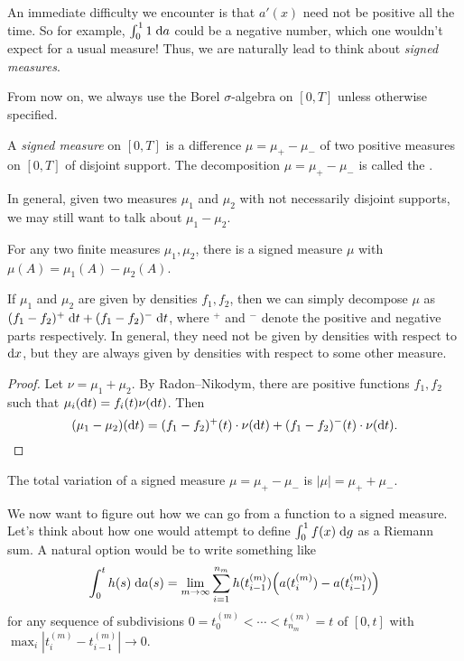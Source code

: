\documentclass[a4paper]{article}
\begin{document}
An immediate difficulty we encounter is that $a'(x)$ need not be positive all the time. So for example, $\int_0^1 1 \;\mathrm{d} a$ could be a negative number, which one wouldn't expect for a usual measure! Thus, we are naturally lead to think about \emph{signed measures}.

From now on, we always use the Borel $\sigma$-algebra on $[0, T]$ unless otherwise specified.
\begin{defi}
  A \emph{signed measure} on $[0, T]$ is a difference $\mu = \mu_+ - \mu_-$ of two positive measures on $[0, T]$ of disjoint support. The decomposition $\mu = \mu_+ - \mu_-$ is called the .
\end{defi}

In general, given two measures $\mu_1$ and $\mu_2$ with not necessarily disjoint supports, we may still want to talk about $\mu_1 - \mu_2$.
\begin{thm}
  For any two finite measures $\mu_1, \mu_2$, there is a signed measure $\mu$ with $\mu(A) = \mu_1(A) - \mu_2(A)$.
\end{thm}

If $\mu_1$ and $\mu_2$ are given by densities $f_1, f_2$, then we can simply decompose $\mu$ as $(f_1 - f_2)^+\;\mathrm{d} t + (f_1 - f_2)^- \;\mathrm{d} t$, where $^+$ and $^-$ denote the positive and negative parts respectively. In general, they need not be given by densities with respect to $\mathrm{d} x$, but they are always given by densities with respect to some other measure.
\begin{proof}
  Let $\nu = \mu_1 + \mu_2$. By Radon--Nikodym, there are positive functions $f_1, f_2$ such that $\mu_i(\mathrm{d} t) = f_i(t) \nu(\mathrm{d} t)$. Then
  \[
    (\mu_1 - \mu_2)(\mathrm{d} t) = (f_1 - f_2)^+(t) \cdot \nu(\mathrm{d} t) + (f_1 - f_2)^- (t) \cdot \nu(\mathrm{d} t).\qedhere
  \]
\end{proof}

\begin{defi}
  The total variation of a signed measure $\mu = \mu_+ - \mu_-$ is $|\mu| = \mu_+ + \mu_-$.
\end{defi}

We now want to figure out how we can go from a function to a signed measure. Let's think about how one would attempt to define $\int_0^1 f(x)\;\mathrm{d} g$ as a Riemann sum. A natural option would be to write something like
\[
  \int_0^t h(s) \;\mathrm{d} a(s) = \lim_{m \to \infty} \sum_{i = 1}^{n_m} h(t_{i - 1}^{(m)}) \Big(a (t_i^{(m)}) - a(t_{i - 1}^{(m)})\Big)
\]
for any sequence of subdivisions $0 = t_0^{(m)} < \cdots < t_{n_m}^{(m)} = t$ of $[0, t]$ with $\max_i |t_i^{(m)} - t_{i - 1}^{(m)}| \to 0$.
\end{document}
